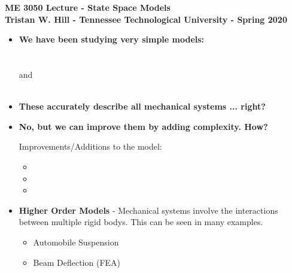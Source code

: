 \documentclass[11pt]{article}
\begin{document}
\textbf{ \LARGE ME 3050 Lecture - State Space Models} \vspace{3mm}\\
\textbf{ \hspace*{5mm}Tristan W. Hill - Tennessee Technological University - Spring 2020 } \vspace{3mm}\\

\Large
\begin{itemize}

\item \textbf{ \Large We have been studying very simple models: } \\ \\

 \\ 

and \\

 \\


\item \textbf{ \Large These accurately describe all mechanical systems ... right? }\vspace{2mm}\\

\item \textbf{ \Large No, but we can improve them by adding complexity. How?  }\vspace{5mm}\\
\Large

	Improvements/Additions to the model:\\
	\begin{itemize}
		\item  

		\item

		\item
	\end{itemize}
	

\newpage
\item \textbf{ \Large Higher Order Models} - Mechanical systems involve the interactions between multiple rigid bodys. This can be seen in many examples.
\Large

	\begin{itemize}
		\item  Automobile Suspension

		\item Beam Deflection (FEA)


\end{itemize}
\end{itemize}
\end{document}
